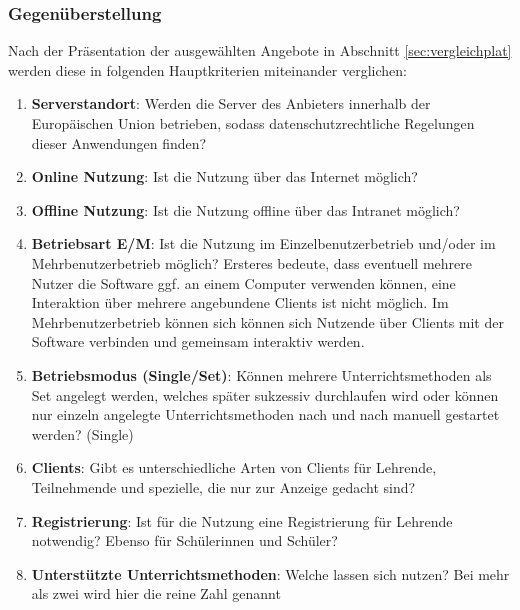 \subsubsection{Gegenüberstellung}\label{sec:gegenstellung}
Nach der Präsentation der ausgewählten Angebote in Abschnitt \ref{sec:vergleichplat} werden diese in folgenden Hauptkriterien miteinander verglichen:
\begin{enumerate}
	\item \textbf{Serverstandort}: Werden die Server des Anbieters innerhalb der Europäischen Union betrieben, sodass datenschutzrechtliche Regelungen dieser Anwendungen finden?
	\item \textbf{Online Nutzung}: Ist die Nutzung über das Internet möglich? 
	\item \textbf{Offline Nutzung}: Ist die Nutzung offline über das Intranet möglich? 
	\item \textbf{Betriebsart E/M}: Ist die Nutzung im Einzelbenutzerbetrieb und/oder im Mehrbenutzerbetrieb möglich? Ersteres bedeute, dass eventuell mehrere Nutzer die Software ggf. an einem Computer verwenden können, eine Interaktion über mehrere angebundene Clients ist nicht möglich. Im Mehrbenutzerbetrieb können sich können sich Nutzende über Clients mit der Software verbinden und gemeinsam interaktiv werden.
	\item \textbf{Betriebsmodus (Single/Set)}: Können mehrere Unterrichtsmethoden als Set angelegt werden, welches später sukzessiv durchlaufen wird oder können nur einzeln angelegte Unterrichtsmethoden nach und nach manuell gestartet werden? (Single)
	\item \textbf{Clients}: Gibt es unterschiedliche  Arten von Clients für Lehrende, Teilnehmende und spezielle, die nur zur Anzeige gedacht sind?
	\item \textbf{Registrierung}: Ist für die Nutzung eine Registrierung für Lehrende notwendig? Ebenso für Schülerinnen und Schüler?
	\item \textbf{Unterstützte Unterrichtsmethoden}: Welche lassen sich nutzen? Bei mehr als zwei wird hier die reine Zahl genannt  
\end{enumerate}

